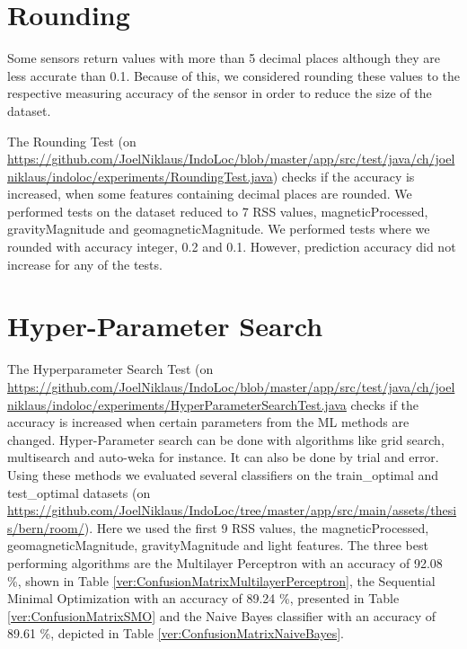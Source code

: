 
\section{Rounding}
\label{sec:Rounding}
Some sensors return values with more than 5 decimal places although they are less accurate than 0.1. Because of this, we considered rounding these values to the respective measuring accuracy of the sensor in order to reduce the size of the dataset.

The Rounding Test (on \url{https://github.com/JoelNiklaus/IndoLoc/blob/master/app/src/test/java/ch/joelniklaus/indoloc/experiments/RoundingTest.java}) checks if the accuracy is increased, when some features containing decimal places are rounded. We performed tests on the dataset reduced to 7 RSS values, magneticProcessed, gravityMagnitude and geomagneticMagnitude. We performed tests where we rounded with accuracy integer, 0.2 and 0.1. However, prediction accuracy did not increase for any of the tests.




\section{Hyper-Parameter Search}
\label{sec:HyperParameterSearch}
The Hyperparameter Search Test (on \url{https://github.com/JoelNiklaus/IndoLoc/blob/master/app/src/test/java/ch/joelniklaus/indoloc/experiments/HyperParameterSearchTest.java} checks if the accuracy is increased when certain parameters from the ML methods are changed. Hyper-Parameter search can be done with algorithms like grid search, multisearch and auto-weka for instance. It can also be done by trial and error. Using these methods we evaluated several classifiers on the train\_optimal and test\_optimal datasets (on  \url{https://github.com/JoelNiklaus/IndoLoc/tree/master/app/src/main/assets/thesis/bern/room/}). Here we used the first 9 RSS values, the magneticProcessed, geomagneticMagnitude, gravityMagnitude and light features. The three best performing algorithms are the Multilayer Perceptron with an accuracy of 92.08 \%, shown in Table \ref{ver:ConfusionMatrixMultilayerPerceptron}, the Sequential Minimal Optimization with an accuracy of 89.24 \%, presented in Table \ref{ver:ConfusionMatrixSMO} and the Naive Bayes classifier with an accuracy of 89.61 \%, depicted in Table \ref{ver:ConfusionMatrixNaiveBayes}.

